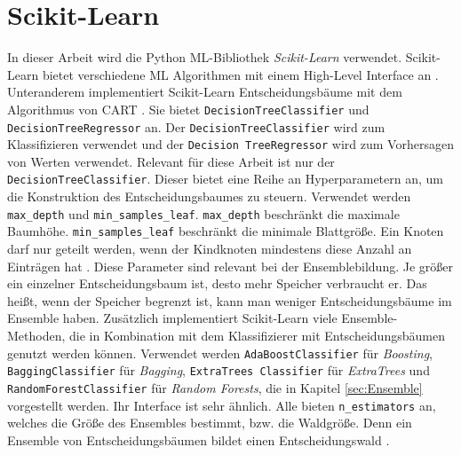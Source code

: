 \section{Scikit-Learn}
In dieser Arbeit wird die Python ML-Bibliothek \textit{Scikit-Learn} verwendet. Scikit-Learn bietet verschiedene ML Algorithmen mit einem High-Level Interface an \cite{scikit-learn}. Unteranderem implementiert Scikit-Learn
Entscheidungsbäume mit dem Algorithmus von CART \cite{ScikitLearnCART}. Sie bietet \texttt{DecisionTreeClassifier} und \texttt{DecisionTreeRegressor} an. Der \texttt{DecisionTreeClassifier} wird zum Klassifizieren
verwendet und der \texttt{Decision TreeRegressor} wird zum Vorhersagen von Werten verwendet.
\newline
\newline
Relevant für diese Arbeit ist nur der \texttt{DecisionTreeClassifier}. Dieser bietet eine Reihe an Hyperparametern an, um die Konstruktion des Entscheidungsbaumes zu steuern. Verwendet werden \texttt{max\_depth}
und \texttt{min\_samples\_leaf}. \texttt{max\_depth} beschränkt die maximale Baumhöhe. \texttt{min\_samples\_leaf} beschränkt die minimale Blattgröße. Ein Knoten darf nur geteilt
werden, wenn der Kindknoten mindestens diese Anzahl an Einträgen hat \cite{ScikitLearnDTC}. Diese Parameter sind relevant bei der Ensemblebildung. Je größer ein einzelner Entscheidungsbaum ist, desto mehr Speicher
verbraucht er. Das heißt, wenn der Speicher begrenzt ist, kann man weniger Entscheidungsbäume im Ensemble haben.
\newline
\newline
Zusätzlich implementiert Scikit-Learn viele Ensemble-Methoden, die in Kombination mit dem Klassifizierer mit Entscheidungsbäumen genutzt werden können. Verwendet werden \texttt{AdaBoostClassifier}
für \textit{Boosting}, \texttt{BaggingClassifier} für \textit{Bagging}, \texttt{ExtraTrees Classifier} für \textit{ExtraTrees} und \texttt{RandomForestClassifier} für \textit{Random Forests}, die in
Kapitel \ref{sec:Ensemble} vorgestellt werden. Ihr Interface ist sehr ähnlich. Alle bieten \texttt{n\_estimators} an, welches die Größe des Ensembles bestimmt, bzw. die Waldgröße. Denn ein Ensemble von
Entscheidungsbäumen bildet einen Entscheidungswald \cite{ScikitLearnEnsemble}.